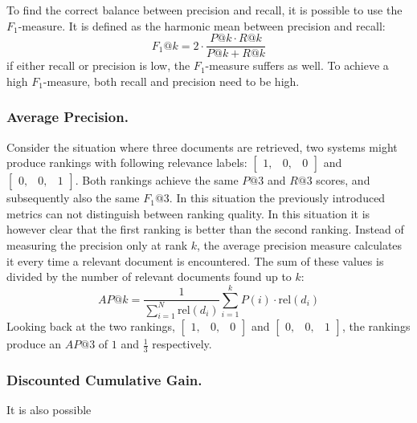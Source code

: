 To find the correct balance between precision and recall, it is possible to use the $F_1$-measure. It is defined as the harmonic mean between precision and recall:
\begin{equation}
	\textit{F}_1@\textit{k}  = 2\cdot\frac{P@k \cdot R@k}{P@k + R@k} 
\end{equation}
if either recall or precision is low, the $F_1$-measure suffers as well. To achieve a high $F_1$-measure, both recall and precision need to be high.

\subsubsection{Average Precision.}
Consider the situation where three documents are retrieved, two systems might produce rankings with following relevance labels: $\left[
\begin{smallmatrix}
	1, & 0, & 0
\end{smallmatrix}
\right]$ and $\left[
\begin{smallmatrix}
	0, & 0, & 1
\end{smallmatrix}
\right]$.
Both rankings achieve the same $P@3$ and $R@3$ scores, and subsequently also the same $F_1@3$. In this situation the previously introduced metrics can not distinguish between ranking quality. In this situation it is however clear that the first ranking is better than the second ranking. 
Instead of measuring the precision only at rank $k$, the average precision measure calculates it every time a relevant document is encountered. The sum of these values is divided by the number of relevant documents found up to $k$:
\begin{equation}
	\textit{AP}@k = \frac{1}{\sum_{i=1}^N\text{rel}\left(d_i\right)}\sum^k_{i=1} P\left(i\right) \cdot \text{rel}\left(d_i\right)
\end{equation}
Looking back at the two rankings, 
$\left[
\begin{smallmatrix}
	1, & 0, & 0
\end{smallmatrix}
\right]$ and $\left[
\begin{smallmatrix}
	0, & 0, & 1
\end{smallmatrix}
\right]$, the rankings produce an $\textit{AP}@3$ of $1$ and $\frac{1}{3}$ respectively. 

\subsubsection{Discounted Cumulative Gain.}
It is also possible

